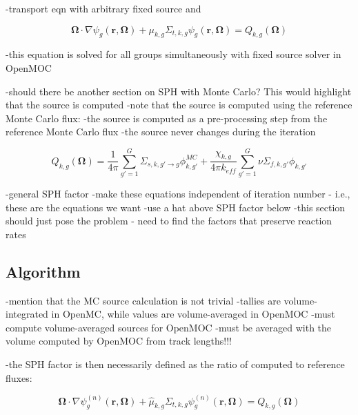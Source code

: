 -transport eqn with arbitrary fixed source and 


\begin{dmath}
\label{eqn:chap6-sph-transport-eqn}
\mathbf{\Omega} \cdot \nabla \psi_{g}(\mathbf{r},\mathbf{\Omega}) + \mu_{k,g}\Sigma_{t,k,g}\psi_{g}(\mathbf{r},\mathbf{\Omega}) = Q_{k,g}(\mathbf{\Omega})
\end{dmath}

-this equation is solved for all groups simultaneously with fixed source solver in OpenMOC

-should there be another section on SPH with Monte Carlo? This would highlight that the source is computed
-note that the source is computed using the reference Monte Carlo flux:
-the source is computed as a pre-processing step from the reference Monte Carlo flux
-the source never changes during the iteration

\begin{dmath}
\label{eqn:chap6-sph-source}
Q_{k,g}(\mathbf{\Omega}) = \frac{1}{4\pi} \sum_{g'=1}^{G} \Sigma_{s,k,g' \rightarrow g}\phi_{k,g'}^{MC} + \frac{\chi_{k,g}}{4\pi k_{eff}}\sum_{g'=1}^{G} \nu\Sigma_{f,k,g'}\phi_{k,g'}
\end{dmath}

-general SPH factor
-make these equations independent of iteration number - i.e., these are the equations we want
-use a hat above SPH factor below 
-this section should just pose the problem - need to find the factors that preserve reaction rates

\subsection{Algorithm}
\label{subsec:chap6-sph-algorithm}

-mention that the MC source calculation is not trivial
-tallies are volume-integrated in OpenMC, while values are volume-averaged in OpenMOC
-must compute volume-averaged sources for OpenMOC
  -must be averaged with the volume computed by OpenMOC from track lengths!!!

-the SPH factor is then necessarily defined as the ratio of computed to reference fluxes:

\begin{dmath}
\label{eqn:chap6-sph-transport-eqn-iterate}
\mathbf{\Omega} \cdot \nabla \psi_{g}^{(n)}(\mathbf{r},\mathbf{\Omega}) + \hat{\mu}_{k,g}\Sigma_{t,k,g}\psi_{g}^{(n)}(\mathbf{r},\mathbf{\Omega}) = Q_{k,g}(\mathbf{\Omega})
\end{dmath}

